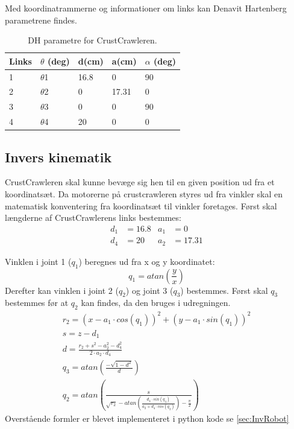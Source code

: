 
Med koordinatrammerne og informationer om links kan Denavit Hartenberg parametrene findes. 

\begin{table}[H]
\centering
\begin{tabular}{l|l|l|l|l}
Links	&	$\theta$ (deg) 	&	d(cm)		&	a(cm)		& 	$\alpha$ (deg)\\
\hline
1		&	$\theta$1			&	16.8			&	0			&	90\\
2		&	$\theta$2			&	0			&	17.31		&	0\\
3		&	$\theta$3			&	0			&	0			&	90\\
4		&	$\theta$4			&	20		&	0			&	0\\
\end{tabular}	
\caption{DH parametre for CrustCrawleren.}
\end{table}

\subsection{Invers kinematik}
CrustCrawleren skal kunne bevæge sig hen til en given position ud fra et koordinatsæt. Da motorerne på crustcrawleren styres ud fra vinkler skal en matematisk konventering fra koordinatsæt til vinkler foretages.\newline
Først skal længderne af CrustCrawlerens links bestemmes:
\begin{align}
	d_1&=16.8	&	a_1&=0\\
	d_4&=20		&	a_2&=17.31
\end{align}

Vinklen i joint 1 ($q_1$) beregnes ud fra x og y koordinatet:
\begin{equation}
	q_1=atan\left(\frac{y}{x}\right)
\end{equation}
Derefter kan vinklen i joint 2 ($q_2$) og joint 3 ($q_3$) bestemmes.
Først skal $q_3$ bestemmes før at $q_2$ kan findes, da den bruges i udregningen.
\begin{gather}
	r_2=\left(x-a_1\cdot cos(q_1)\right)^2+\left(y-a_1\cdot sin(q_1)\right)^2\\
	s=z-d_1\\
	d=\frac{r_2+s^2-a_2^2-d_4^2}{2\cdot a_2\cdot d_4}\\
	q_3=atan\left(\frac{-\sqrt{1-d^2}}{d}\right)\\
	q_2=atan\left(\frac{s}{\sqrt{r_2}-atan\left(\frac{d_4\cdot sin(q_3)}{a_2+d_4\cdot cos(q_3)}\right)-\frac{\pi}{2}}\right)
\end{gather}
Overstående formler er blevet implementeret i python kode se \vref{sec:InvRobot}

